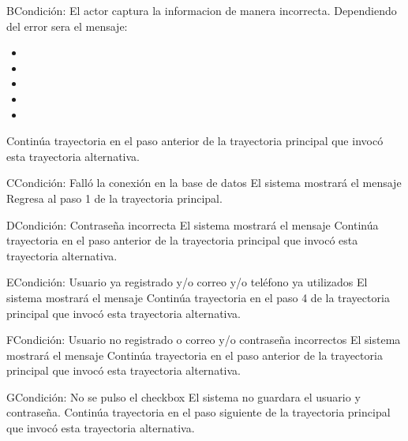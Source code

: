 	\begin{UCtrayectoriaA}{B}{Condición: El actor captura la informacion de manera incorrecta.}
		\UCpaso[\UCsist] Dependiendo del error sera el mensaje:
			\begin{itemize}
			\item {}
			\item {}
			\item {}
			\item {}
			\item {}
			\end{itemize}
		\UCpaso[\UCsist] Continúa trayectoria en el paso anterior de la trayectoria principal que invocó esta trayectoria alternativa. 
	\end{UCtrayectoriaA}
	\begin{UCtrayectoriaA}{C}{Condición: Falló la conexión en la base de datos}
		\UCpaso[\UCsist] El sistema mostrará el mensaje 
		\UCpaso[\UCsist] Regresa al paso 1 de la trayectoria principal. 
	\end{UCtrayectoriaA}
	\begin{UCtrayectoriaA}{D}{Condición: Contraseña incorrecta}
		\UCpaso[\UCsist] El sistema mostrará el mensaje 
		\UCpaso[\UCsist] Continúa trayectoria en el paso anterior de la trayectoria  principal que invocó esta trayectoria alternativa. 
	\end{UCtrayectoriaA}
	\begin{UCtrayectoriaA}{E}{Condición: Usuario ya registrado y/o correo y/o teléfono ya utilizados}
		\UCpaso[\UCsist] El sistema mostrará el mensaje 
		\UCpaso[\UCsist] Continúa trayectoria en el paso 4 de la trayectoria  principal que invocó esta trayectoria alternativa. 
	\end{UCtrayectoriaA}
	\begin{UCtrayectoriaA}{F}{Condición: Usuario no registrado o correo y/o contraseña incorrectos}
		\UCpaso[\UCsist] El sistema mostrará el mensaje 
		\UCpaso[\UCsist] Continúa trayectoria en el paso anterior de la trayectoria principal que invocó esta trayectoria alternativa. 
	\end{UCtrayectoriaA}
	\begin{UCtrayectoriaA}{G}{Condición: No se pulso el checkbox}
		\UCpaso[\UCsist] El sistema no guardara el usuario y contraseña.
		\UCpaso[\UCsist] Continúa trayectoria en el paso siguiente de la trayectoria principal que invocó esta trayectoria alternativa. 
	\end{UCtrayectoriaA}
